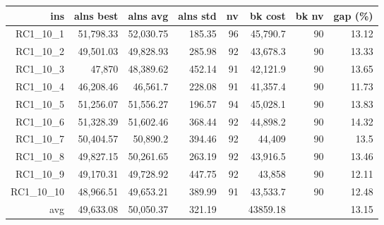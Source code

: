   \begin{table}[caption={Kết quả đo với tập HG\_RC\_1\_10 1000 yêu cầu}, label=exp:HGRC110]
    \centering
    \begin{tabular}{rrrrrrrr}
    \hline
    ins & alns best & alns avg & alns std & nv & bk cost & bk nv & gap (\%) \\ \hline
    RC1\_10\_1 & 51,798.33 & 52,030.75 & 185.35 & 96 & 45,790.7 & 90 & 13.12 \\ \hline
    RC1\_10\_2 & 49,501.03 & 49,828.93 & 285.98 & 92 & 43,678.3 & 90 & 13.33 \\ \hline
    RC1\_10\_3 & 47,870 & 48,389.62 & 452.14 & 91 & 42,121.9 & 90 & 13.65 \\ \hline
    RC1\_10\_4 & 46,208.46 & 46,561.7 & 228.08 & 91 & 41,357.4 & 90 & 11.73 \\ \hline
    RC1\_10\_5 & 51,256.07 & 51,556.27 & 196.57 & 94 & 45,028.1 & 90 & 13.83 \\ \hline
    RC1\_10\_6 & 51,328.39 & 51,602.46 & 368.44 & 92 & 44,898.2 & 90 & 14.32 \\ \hline
    RC1\_10\_7 & 50,404.57 & 50,890.2 & 394.46 & 92 & 44,409 & 90 & 13.5 \\ \hline
    RC1\_10\_8 & 49,827.15 & 50,261.65 & 263.19 & 92 & 43,916.5 & 90 & 13.46 \\ \hline
    RC1\_10\_9 & 49,170.31 & 49,728.92 & 447.75 & 92 & 43,858 & 90 & 12.11 \\ \hline
    RC1\_10\_10 & 48,966.51 & 49,653.21 & 389.99 & 91 & 43,533.7 & 90 & 12.48 \\ \hline
    avg & 49,633.08 & 50,050.37 & 321.19 & & 43859.18 & & 13.15 \\ \hline
    \end{tabular}
  \end{table}